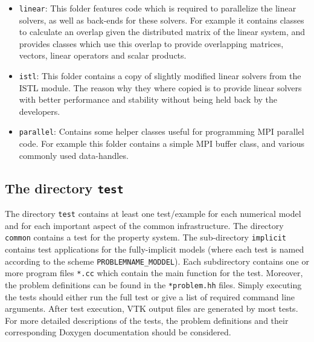 \begin{itemize}
\item \texttt{linear}: This folder features code which is required to
  parallelize the linear solvers, as well as back-ends for these
  solvers. For example it contains classes to calculate an overlap
  given the distributed matrix of the linear system, and provides
  classes which use this overlap to provide overlapping matrices,
  vectors, linear operators and scalar products.

\item \texttt{istl}: This folder contains a copy of slightly modified
  linear solvers from the ISTL \Dune module. The reason why they where
  copied is to provide linear solvers with better performance and
  stability without being held back by the \Dune developers.

\item \texttt{parallel}: Contains some helper classes useful for
  programming MPI parallel code. For example this folder contains a
  simple MPI buffer class, and various commonly used \Dune
  data-handles.
\end{itemize}

\subsection{The directory \texttt{test}}\label{sec:test}

The directory \texttt{test} contains at least one test/example for
each numerical model and for each important aspect of the common
\eWoms infrastructure. The directory \texttt{common} contains a test
for the property system.  The sub-directory \texttt{implicit}
contains test applications for the fully-implicit models (where each
test is named according to the scheme \texttt{PROBLEMNAME\_MODDEL}).
Each subdirectory contains one or more program
files \texttt{*.cc} which contain the main function for the
test. Moreover, the problem definitions can be found in the
\texttt{*problem.hh} files. Simply executing the tests should either
run the full test or give a list of required command line
arguments. After test execution, VTK output files are generated by
most tests.  For more detailed descriptions of the tests, the problem
definitions and their corresponding Doxygen documentation should be
considered.

